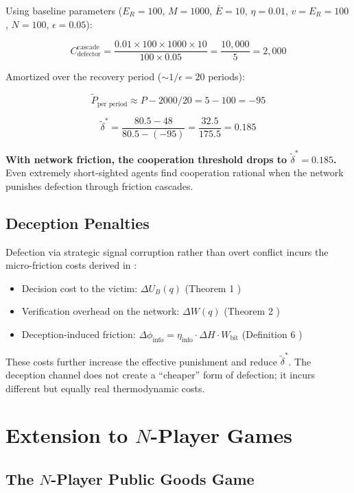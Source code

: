 \documentclass[11pt]{article}
\theoremstyle{plain}
\theoremstyle{definition}
\theoremstyle{remark}
\let\origsection\section
\renewcommand{\section}{\needspace{12\baselineskip}\origsection}
\let\origsubsection\subsection
\renewcommand{\subsection}{\needspace{7\baselineskip}\origsubsection}
\providecommand{\tightlist}{%
  \setlength{\itemsep}{0pt}\setlength{\parskip}{0pt}}
\begin{document}
Using baseline parameters (\(E_R = 100\), \(M = 1000\),
\(\bar{E} = 10\), \(\eta = 0.01\), \(v = E_R = 100\), \(N = 100\),
\(\epsilon = 0.05\)):

\[C_{\text{defector}}^{\text{cascade}} = \frac{0.01 \times 100 \times 1000 \times 10}{100 \times 0.05} = \frac{10{,}000}{5} = 2{,}000\]

Amortized over the recovery period (\(\sim 1/\epsilon = 20\) periods):

\[\tilde{P}_{\text{per period}} \approx P - 2000/20 = 5 - 100 = -95\]

\[\tilde{\delta}^* = \frac{80.5 - 48}{80.5 - (-95)} = \frac{32.5}{175.5} = 0.185\]

\textbf{With network friction, the cooperation threshold drops to
\(\tilde{\delta}^* = 0.185\).} Even extremely short-sighted agents find
cooperation rational when the network punishes defection through
friction cascades.

\subsection{Deception Penalties}\label{deception-penalties}

Defection via strategic signal corruption rather than overt conflict
incurs the micro-friction costs derived in \citep{TC-II}:

\begin{itemize}
\tightlist
\item
  Decision cost to the victim: \(\Delta U_B(q)\) (Theorem 1
  \citep{TC-II})
\item
  Verification overhead on the network: \(\Delta W(q)\) (Theorem 2
  \citep{TC-II})
\item
  Deception-induced friction:
  \(\Delta\phi_{\text{info}} = \eta_{\text{info}} \cdot \Delta H \cdot W_{\text{bit}}\)
  (Definition 6 \citep{TC-II})
\end{itemize}

These costs further increase the effective punishment and reduce
\(\tilde{\delta}^*\). The deception channel does not create a
``cheaper'' form of defection; it incurs different but equally real
thermodynamic costs.

\section{\texorpdfstring{Extension to \(N\)-Player
Games}{Extension to N-Player Games}}\label{extension-to-n-player-games}

\subsection{\texorpdfstring{The \(N\)-Player Public Goods
Game}{The N-Player Public Goods Game}}\label{the-n-player-public-goods-game}
\end{document}
